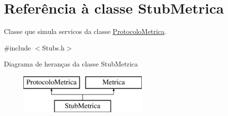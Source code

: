 \hypertarget{class_stub_metrica}{
\section{\-Referência à classe \-Stub\-Metrica}
\label{class_stub_metrica}
}


\-Classe que simula servicos da classe \hyperlink{class_protocolo_metrica}{\-Protocolo\-Metrica}.  




{\ttfamily \#include $<$\-Stubs.\-h$>$}

\-Diagrama de heranças da classe \-Stub\-Metrica\begin{figure}[H]
\begin{center}
\leavevmode
\includegraphics[height=2.000000cm]{class_stub_metrica}
\end{center}
\end{figure}
